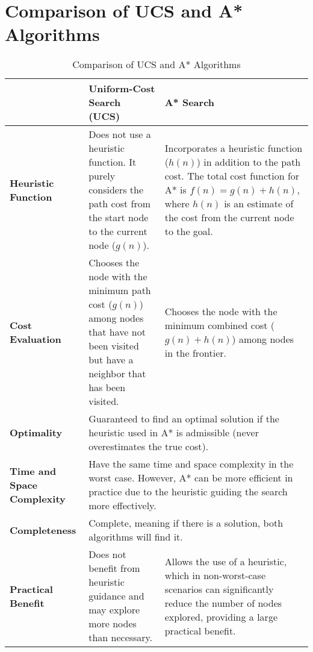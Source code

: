 \section{Comparison of UCS and A* Algorithms}

\begin{table}[h!]
    \centering
    \begin{tabular}{|l|p{6cm}|p{6cm}|}
        \hline
        & \textbf{Uniform-Cost Search (UCS)} & \textbf{A* Search} \\ \hline
        \textbf{Heuristic Function} & 
        Does not use a heuristic function. It purely considers the path cost from the start node to the current node ($g(n)$). & 
        Incorporates a heuristic function ($h(n)$) in addition to the path cost. The total cost function for A* is $f(n) = g(n) + h(n)$, where $h(n)$ is an estimate of the cost from the current node to the goal. \\ \hline
        
        \textbf{Cost Evaluation} & 
        Chooses the node with the minimum path cost ($g(n)$) among nodes that have not been visited but have a neighbor that has been visited. & 
        Chooses the node with the minimum combined cost ($g(n) + h(n)$) among nodes in the frontier. \\ \hline
        
        \textbf{Optimality} & 
        \multicolumn{2}{|p{12cm}|}{Guaranteed to find an optimal solution if the heuristic used in A* is admissible (never overestimates the true cost).} \\ \hline
        
        \textbf{Time and Space Complexity} & 
        \multicolumn{2}{|p{12cm}|}{Have the same time and space complexity in the worst case. However, A* can be more efficient in practice due to the heuristic guiding the search more effectively.} \\ \hline
        
        \textbf{Completeness} & 
        \multicolumn{2}{|p{12cm}|}{Complete, meaning if there is a solution, both algorithms will find it.} \\ \hline
        
        \textbf{Practical Benefit} & 
        Does not benefit from heuristic guidance and may explore more nodes than necessary. & 
        Allows the use of a heuristic, which in non-worst-case scenarios can significantly reduce the number of nodes explored, providing a large practical benefit. \\ \hline
    \end{tabular}
    \caption{Comparison of UCS and A* Algorithms}
    \label{tab:ucs_vs_astar}
\end{table}
